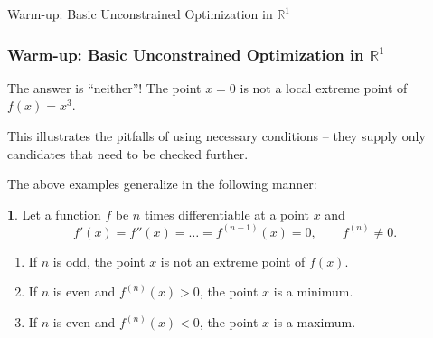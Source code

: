 \documentclass[10pt]{beamer}
\theoremstyle{definition}
\newtheorem{Fact}{\translate{Fact}}
\begin{document}
\begin{section}{Warm-up: Basic Unconstrained Optimization in $ \mathbb{R}^1 $}
\begin{frame}[fragile]
\frametitle{Warm-up: Basic Unconstrained Optimization in $ \mathbb{R}^1 $}
\addtocounter{theorem}{-1}
\begin{example}[cont.]
The answer is ``neither''! The point $ x=0 $ is not a local extreme point of $ f(x)=x^3 $.\medskip

This illustrates the pitfalls of using necessary conditions -- they supply only candidates that need to be checked further.
\end{example}

The above examples generalize in the following manner:
\begin{Fact}
Let a function $ f $ be $ n $ times differentiable at a point $ x $ and 
\[ f'(x)=f''(x)=\ldots=f^{(n-1)}(x)=0,\qquad f^{(n)}\neq 0. \] \vskip -5pt
\begin{enumerate}
\item If $ n $ is odd, the point $ x $ is not an extreme point of $ f(x) $.
\item If $ n $ is even and $ f^{(n)}(x)>0 $, the point $ x $ is a minimum.
\item If $ n $ is even and $ f^{(n)}(x)<0 $, the point $ x $ is a maximum.
\end{enumerate}
\label{fc:SCsR1}
\end{Fact}
\end{frame}

\end{section}
\end{document}
